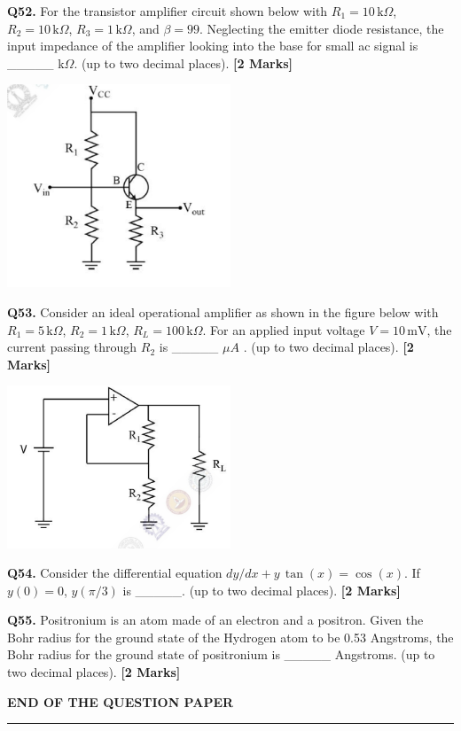 \documentclass[11pt]{article}
\newcommand{\questionb}[2]{
    \noindent\textbf{Q#2.} #1 \hfill \textbf{[2 Marks]}
}
\begin{document}
\questionb{For the transistor amplifier circuit shown below with \( R_1 = 10 \, \text{k}\Omega \), \( R_2 = 10 \, \text{k}\Omega \), \( R_3 = 1 \, \text{k}\Omega \), and \( \beta = 99 \). Neglecting the emitter diode resistance, the input impedance of the amplifier looking into the base for small ac signal is \_\_\_\_\_ k\(\Omega\). (up to two decimal places).}{52}
\begin{center}
\includegraphics[width=0.5\textwidth]{figures/52.png}
\end{center}
\vspace{0.5cm}

\questionb{Consider an ideal operational amplifier as shown in the figure below with \( R_1 = 5 \, \text{k}\Omega \), \( R_2 = 1 \, \text{k}\Omega \), \( R_L = 100 \, \text{k}\Omega \). For an applied input voltage \( V = 10 \, \text{mV} \), the current passing through \( R_2 \) is \_\_\_\_\_ \(\mu A\) . (up to two decimal places).}{53}
\begin{center}
\includegraphics[width=0.5\textwidth]{figures/53.png}
\end{center}
\vspace{0.5cm}

\questionb{Consider the differential equation \( dy / dx + y \, \tan(x) = \cos(x) \). If \( y(0) = 0 \), \( y(\pi / 3) \) is \_\_\_\_\_. (up to two decimal places).}{54}
\vspace{0.5cm}

\questionb{Positronium is an atom made of an electron and a positron. Given the Bohr radius for the ground state of the Hydrogen atom to be 0.53 Angstroms, the Bohr radius for the ground state of positronium is \_\_\_\_\_ Angstroms. (up to two decimal places).}{55}
\vspace{0.5cm}

\begin{center}
\textbf{END OF THE QUESTION PAPER} \\
\rule{\textwidth}{0.5pt}
\end{center}
\end{document}
